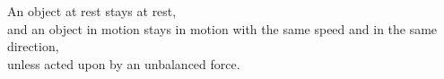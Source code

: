 \documentclass[preview]{standalone}
\begin{document}
An object at rest stays at rest,\\and an object in motion stays in motion with the same speed and in the same direction,\\unless acted upon by an unbalanced force.\\
\end{document}
